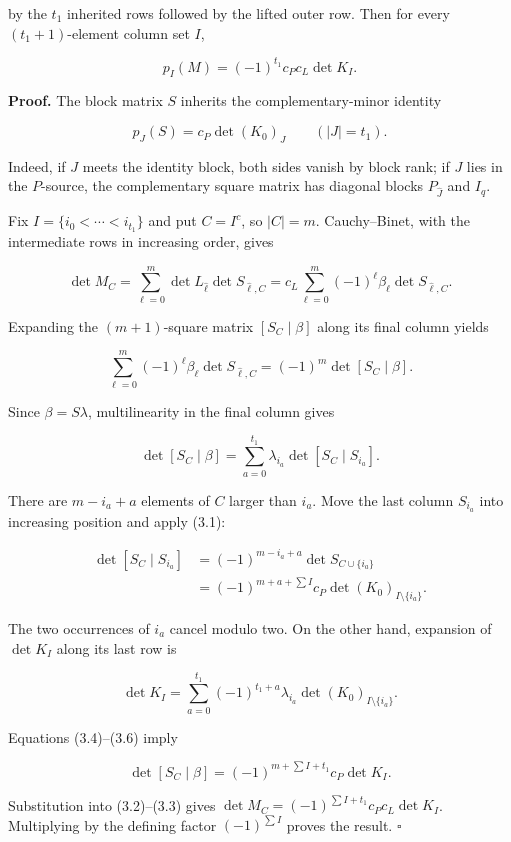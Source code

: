 \documentclass[
  11pt,
  a4paper,
]{article}
\begin{document}
by the \(t_1\) inherited rows followed by the lifted outer row. Then for
every \((t_1+1)\)-element column set \(I\),

\[
 \boxed{
 p_I(M)=(-1)^{t_1}c_Pc_L\det K_I.
 }
\]

\textbf{Proof.} The block matrix \(S\) inherits the complementary-minor
identity

\[
 p_J(S)=c_P\det(K_0)_J\qquad(|J|=t_1).
\tag{3.1}
\]

Indeed, if \(J\) meets the identity block, both sides vanish by block
rank; if \(J\) lies in the \(P\)-source, the complementary square matrix
has diagonal blocks \(P_{\widehat J}\) and \(I_q\).

Fix \(I=\{i_0<\cdots<i_{t_1}\}\) and put \(C=I^c\), so \(|C|=m\).
Cauchy--Binet, with the intermediate rows in increasing order, gives

\[
 \det M_C
 =\sum_{\ell=0}^{m}\det L_{\widehat\ell}\det S_{\widehat\ell,C}
 =c_L\sum_{\ell=0}^{m}(-1)^\ell\beta_\ell
       \det S_{\widehat\ell,C}.
\tag{3.2}
\]

Expanding the \((m+1)\)-square matrix \([S_C\mid\beta]\) along its final
column yields

\[
 \sum_{\ell=0}^{m}(-1)^\ell\beta_\ell
       \det S_{\widehat\ell,C}
 =(-1)^m\det[S_C\mid\beta].
\tag{3.3}
\]

Since \(\beta=S\lambda\), multilinearity in the final column gives

\[
 \det[S_C\mid\beta]
 =\sum_{a=0}^{t_1}\lambda_{i_a}\det[S_C\mid S_{i_a}].
\tag{3.4}
\]

There are \(m-i_a+a\) elements of \(C\) larger than \(i_a\). Move the
last column \(S_{i_a}\) into increasing position and apply (3.1):

\[
 \begin{aligned}
 \det[S_C\mid S_{i_a}]
 &=(-1)^{m-i_a+a}\det S_{C\cup\{i_a\}}\\
 &=(-1)^{m+a+\sum I}c_P
   \det(K_0)_{I\setminus\{i_a\}}.
 \end{aligned}
\tag{3.5}
\]

The two occurrences of \(i_a\) cancel modulo two. On the other hand,
expansion of \(\det K_I\) along its last row is

\[
 \det K_I
 =\sum_{a=0}^{t_1}(-1)^{t_1+a}\lambda_{i_a}
   \det(K_0)_{I\setminus\{i_a\}}.
\tag{3.6}
\]

Equations (3.4)--(3.6) imply

\[
 \det[S_C\mid\beta]
 =(-1)^{m+\sum I+t_1}c_P\det K_I.
\tag{3.7}
\]

Substitution into (3.2)--(3.3) gives
\(\det M_C=(-1)^{\sum I+t_1}c_Pc_L\det K_I\). Multiplying by the
defining factor \((-1)^{\sum I}\) proves the result. \(\square\)
\end{document}
